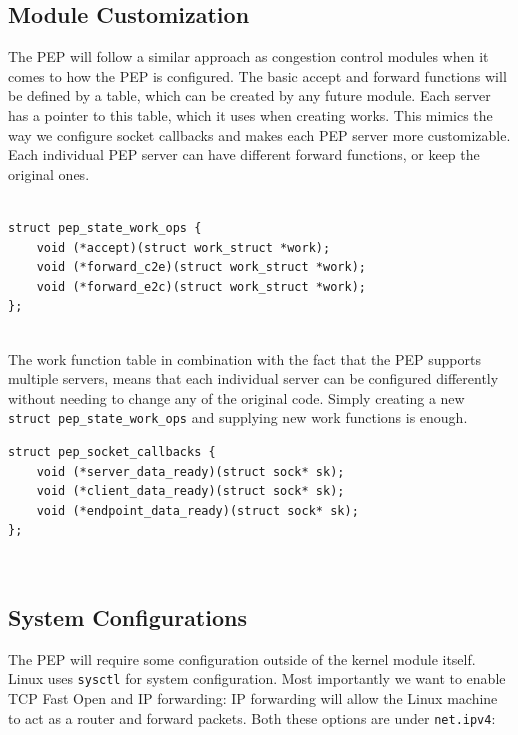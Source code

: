 \documentclass[a4paper,english, 11pt]{report}
\begin{document}
\subsection{Module Customization}
The PEP will follow a similar approach as congestion control modules when it comes to how the PEP is configured. The basic accept and forward functions will be defined by a table, which can be created by any future module. Each server has a pointer to this table, which it uses when creating works. This mimics the way we configure socket callbacks and makes each PEP server more customizable. Each individual PEP server can have different forward functions, or keep the original ones.\\\\

\noindent\begin{minipage}{\linewidth}
\begin{verbatim}
struct pep_state_work_ops {
    void (*accept)(struct work_struct *work);
    void (*forward_c2e)(struct work_struct *work);
    void (*forward_e2c)(struct work_struct *work);
};
\end{verbatim}
\end{minipage}\\

The work function table in combination with the fact that the PEP supports multiple servers, means that each individual server can be configured differently without needing to change any of the original code. Simply creating a new \verb|struct pep_state_work_ops| and supplying new work functions is enough.\\

\noindent\begin{minipage}{\linewidth}
\begin{verbatim}
struct pep_socket_callbacks {
    void (*server_data_ready)(struct sock* sk);
    void (*client_data_ready)(struct sock* sk);
    void (*endpoint_data_ready)(struct sock* sk);
};
\end{verbatim}
\end{minipage}\\

\subsection{System Configurations}
The PEP will require some configuration outside of the kernel module itself. Linux uses \verb|sysctl| for system configuration. Most importantly we want to enable TCP Fast Open and IP forwarding: IP forwarding will allow the Linux machine to act as a router and forward packets. Both these options are under \verb|net.ipv4|:\\
\end{document}
